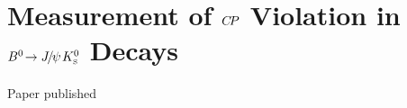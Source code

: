 
\chapter[Measurement of \texorpdfstring{$\CP$}{CP} Violation in \texorpdfstring{$\BdToJpsiKS$}{Bd2JpsiKS} Decays (25 pages)]{Measurement of \texorpdfstring{$\CP$}{CP} Violation in \texorpdfstring{$\BdToJpsiKS$}{Bd2JpsiKS} Decays}
\label{sec:bd2jpsiks}

Paper published~\cite{LHCb-Paper-2015-004}









